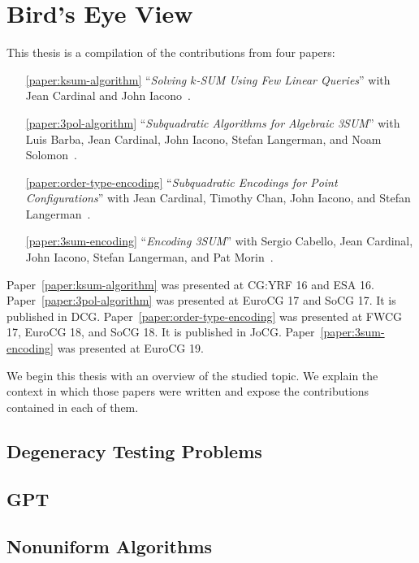 \chapter{Bird's Eye View}



This thesis is a compilation of the contributions from four papers:
%
\begin{enumerate}
	\item[\ref{paper:ksum-algorithm}] ``\emph{Solving \(k\)-SUM Using Few
		Linear Queries}''
		with Jean Cardinal and John Iacono~\cite{CIO16}.
	\item[\ref{paper:3pol-algorithm}] ``\emph{Subquadratic Algorithms for
		Algebraic 3SUM}''
		with Luis Barba, Jean Cardinal, John Iacono, Stefan Langerman, and Noam Solomon~\cite{BCILOS19}.
	\item[\ref{paper:order-type-encoding}] ``\emph{Subquadratic Encodings for
		Point Configurations}''
		with Jean Cardinal, Timothy Chan, John Iacono, and Stefan Langerman~\cite{CCILO19}.
	\item[\ref{paper:3sum-encoding}] ``\emph{Encoding 3SUM}''
		with Sergio Cabello, Jean Cardinal, John Iacono, Stefan Langerman,
		and Pat Morin~\cite{CCILMO19}.
\end{enumerate}
%
Paper~\ref{paper:ksum-algorithm} was presented at CG:YRF 16 and ESA 16.
%
Paper~\ref{paper:3pol-algorithm} was presented at EuroCG 17 and SoCG 17. It is published in DCG.
%
Paper~\ref{paper:order-type-encoding} was presented at FWCG 17, EuroCG 18, and SoCG 18. It is published in JoCG.
%
Paper~\ref{paper:3sum-encoding} was presented at EuroCG 19.

We begin this thesis with an overview of the studied topic.
%
We explain the context in which those papers were written and expose
the contributions contained in each of them.

\section*{Degeneracy Testing Problems}


\section*{GPT}


\section*{Nonuniform Algorithms}


